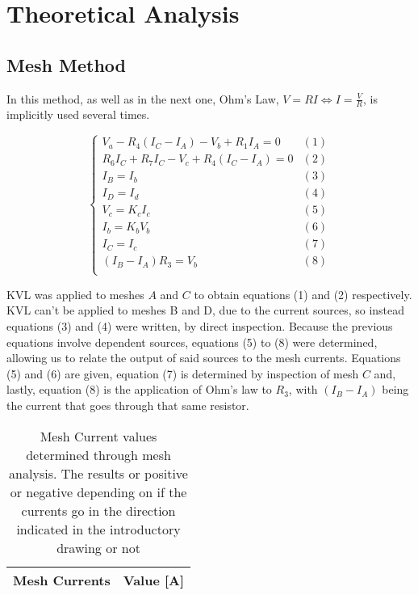 \section{Theoretical Analysis}
\label{sec:analysis}
\subsection{Mesh Method}

\par
In this method, as well as in the next one, Ohm's Law, $V=RI \Leftrightarrow I = \frac{V}{R}$, is implicitly used several times.


\begin{equation}
  \begin{cases}
    V_a - R_4 (I_C-I_A) - V_b + R_1 I_A = 0 & \mbox{$(1)$}\\
    R_6 I_C + R_7 I_C - V_c + R_4(I_C-I_A) = 0 & \mbox{$(2)$}\\
    I_B = I_b & \mbox{$(3)$}\\
    I_D = I_d & \mbox{$(4)$}\\
    V_c = K_c I_c & \mbox{$(5)$} \\
    I_b = K_b V_b & \mbox{$(6)$} \\
    I_C = I_c & \mbox{$(7)$}\\
    (I_B-I_A) R_3 = V_b & \mbox{$(8)$}\\
  \end{cases}
\end{equation}

\par
KVL was applied to meshes $A$ and $C$ to obtain equations (1) and (2) respectively. KVL can't be applied to meshes B and D, due to the current sources, so instead equations (3) and (4) were written, by direct inspection. Because the previous equations involve dependent sources, equations (5) to (8) were determined, allowing us to relate the output of said sources to the mesh currents. Equations (5) and (6) are given, equation (7) is determined by inspection of mesh $C$ and, lastly, equation (8) is the application of Ohm's law to $R_3$, with $(I_B-I_A)$ being the current that goes through that same resistor.

\begin{table}[hbt!]
  \centering
  \begin{tabular}{|c|c|}
    \hline    
    {\bf Mesh Currents} & {\bf Value [A]} \\ \hline
    
  \end{tabular}
  \caption{Mesh Current values determined through mesh analysis. The results or positive or negative depending on if the currents go in the direction indicated in the introductory drawing or not}
  \label{tab:mesh}
\end{table}

